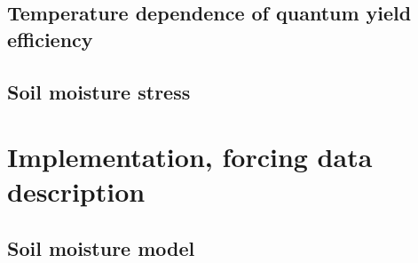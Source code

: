\documentclass{myreport}
\begin{document}



\subsection{Temperature dependence of quantum yield efficiency}

\subsection{Soil moisture stress}

\section{Implementation, forcing data description}

\subsection{Soil moisture model}
\end{document}

